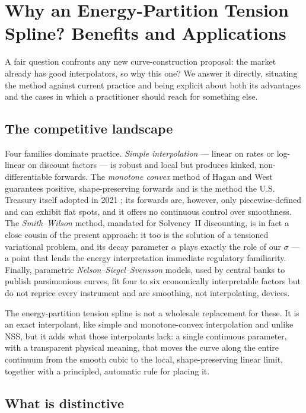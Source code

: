 \documentclass[10pt]{article}
\begin{document}
\section{Why an Energy-Partition Tension Spline? Benefits and Applications}\label{sec:why}
A fair question confronts any new curve-construction proposal: the market already has good
interpolators, so why this one? We answer it directly, situating the method against current
practice and being explicit about both its advantages and the cases in which a practitioner
should reach for something else.

\subsection{The competitive landscape}
Four families dominate practice. \emph{Simple interpolation} --- linear on rates or log-linear
on discount factors --- is robust and local but produces kinked, non-differentiable forwards.
The \emph{monotone convex} method of Hagan and West~\cite{Hagan} guarantees positive,
shape-preserving forwards and is the method the U.S. Treasury itself adopted in 2021
\cite{TreasuryMethod}; its forwards are, however, only piecewise-defined and can exhibit flat
spots, and it offers no continuous control over smoothness. The \emph{Smith--Wilson} method,
mandated for Solvency~II discounting, is in fact a close cousin of the present approach: it too
is the solution of a tensioned variational problem, and its decay parameter $\alpha$ plays
exactly the role of our $\sigma$ --- a point that lends the energy interpretation immediate
regulatory familiarity. Finally, parametric \emph{Nelson--Siegel--Svensson} models, used by
central banks to publish parsimonious curves, fit four to six economically interpretable
factors but do not reprice every instrument and are smoothing, not interpolating, devices.

The energy-partition tension spline is not a wholesale replacement for these. It is an exact
interpolant, like simple and monotone-convex interpolation and unlike NSS, but it adds what
those interpolants lack: a single continuous parameter, with a transparent physical meaning,
that moves the curve along the entire continuum from the smooth cubic to the local,
shape-preserving linear limit, together with a principled, automatic rule for placing it.

\subsection{What is distinctive}
\end{document}
